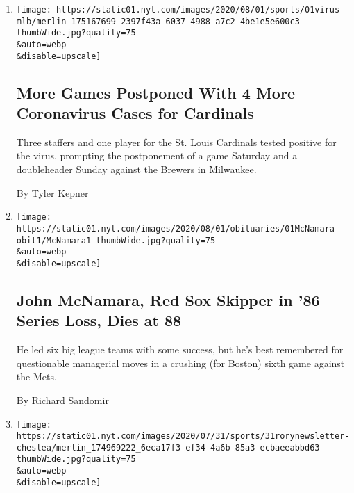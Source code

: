 \begin{enumerate}
\def\labelenumi{\arabic{enumi}.}
\item
  \href{/2020/08/01/sports/baseball/coronavirus-cardinals.html}{}

  \texttt{[image: https://static01.nyt.com/images/2020/08/01/sports/01virus-mlb/merlin\_175167699\_2397f43a-6037-4988-a7c2-4be1e5e600c3-thumbWide.jpg?quality=75\\\&auto=webp\\\&disable=upscale]}

  \hypertarget{more-games-postponed-with-4-more-coronavirus-cases-for-cardinals}{%
  \subsection{More Games Postponed With 4 More Coronavirus Cases for
  Cardinals}\label{more-games-postponed-with-4-more-coronavirus-cases-for-cardinals}}

  Three staffers and one player for the St. Louis Cardinals tested
  positive for the virus, prompting the postponement of a game Saturday
  and a doubleheader Sunday against the Brewers in Milwaukee.

  By Tyler Kepner
\item
  \href{/2020/07/31/sports/baseball/john-mcnamara-dead.html}{}

  \texttt{[image: https://static01.nyt.com/images/2020/08/01/obituaries/01McNamara-obit1/McNamara1-thumbWide.jpg?quality=75\\\&auto=webp\\\&disable=upscale]}

  \hypertarget{john-mcnamara-red-sox-skipper-in-86-series-loss-dies-at-88}{%
  \subsection{John McNamara, Red Sox Skipper in '86 Series Loss, Dies at
  88}\label{john-mcnamara-red-sox-skipper-in-86-series-loss-dies-at-88}}

  He led six big league teams with some success, but he's best
  remembered for questionable managerial moves in a crushing (for
  Boston) sixth game against the Mets.

  By Richard Sandomir
\item
  \href{/2020/07/31/sports/soccer/soccer-baseball.html}{}

  \texttt{[image: https://static01.nyt.com/images/2020/07/31/sports/31rorynewsletter-cheslea/merlin\_174969222\_6eca17f3-ef34-4a6b-85a3-ecbaeeabbd63-thumbWide.jpg?quality=75\\\&auto=webp\\\&disable=upscale]}

  \hypertarget{rory-smith-on-soccer}{%
}
\end{enumerate}
